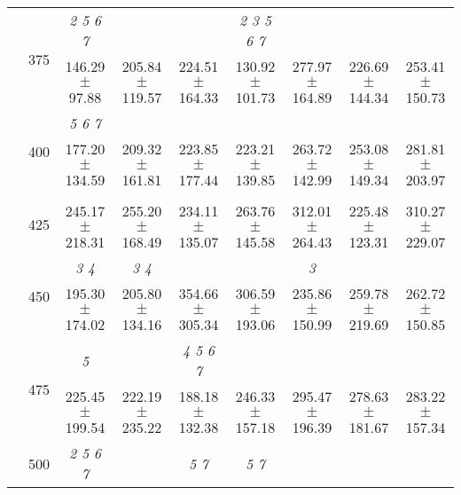 \begin{table}[h]
{\begin{tabular}{
        ccccccccc}
 & \multirow{2}{*}{375}& \cellcolor[HTML]{EFEFEF} \textit{ 2 5 6 7 }& \cellcolor[HTML]{EFEFEF} & \cellcolor[HTML]{EFEFEF} & \cellcolor[HTML]{EFEFEF} \textit{ 2 3 5 6 7 }& \cellcolor[HTML]{EFEFEF} & \cellcolor[HTML]{EFEFEF} & \cellcolor[HTML]{EFEFEF}  \\ 
 & & \cellcolor[HTML]{EFEFEF} 146.29 $\pm$ 97.88& \cellcolor[HTML]{EFEFEF} 205.84 $\pm$ 119.57& \cellcolor[HTML]{EFEFEF} 224.51 $\pm$ 164.33& \cellcolor[HTML]{EFEFEF} 130.92 $\pm$ 101.73& \cellcolor[HTML]{EFEFEF} 277.97 $\pm$ 164.89& \cellcolor[HTML]{EFEFEF} 226.69 $\pm$ 144.34& \cellcolor[HTML]{EFEFEF} 253.41 $\pm$ 150.73 \\ 
 & \multirow{2}{*}{400}& \textit{ 5 6 7 }& & & & & &  \\ 
 & & 177.20 $\pm$ 134.59& 209.32 $\pm$ 161.81& 223.85 $\pm$ 177.44& 223.21 $\pm$ 139.85& 263.72 $\pm$ 142.99& 253.08 $\pm$ 149.34& 281.81 $\pm$ 203.97 \\ 
 & \multirow{2}{*}{425}& \cellcolor[HTML]{EFEFEF} & \cellcolor[HTML]{EFEFEF} & \cellcolor[HTML]{EFEFEF} & \cellcolor[HTML]{EFEFEF} & \cellcolor[HTML]{EFEFEF} & \cellcolor[HTML]{EFEFEF} & \cellcolor[HTML]{EFEFEF}  \\ 
 & & \cellcolor[HTML]{EFEFEF} 245.17 $\pm$ 218.31& \cellcolor[HTML]{EFEFEF} 255.20 $\pm$ 168.49& \cellcolor[HTML]{EFEFEF} 234.11 $\pm$ 135.07& \cellcolor[HTML]{EFEFEF} 263.76 $\pm$ 145.58& \cellcolor[HTML]{EFEFEF} 312.01 $\pm$ 264.43& \cellcolor[HTML]{EFEFEF} 225.48 $\pm$ 123.31& \cellcolor[HTML]{EFEFEF} 310.27 $\pm$ 229.07 \\ 
 & \multirow{2}{*}{450}& \textit{ 3 4 }& \textit{ 3 4 }& & & \textit{ 3 }& &  \\ 
 & & 195.30 $\pm$ 174.02& 205.80 $\pm$ 134.16& 354.66 $\pm$ 305.34& 306.59 $\pm$ 193.06& 235.86 $\pm$ 150.99& 259.78 $\pm$ 219.69& 262.72 $\pm$ 150.85 \\ 
 & \multirow{2}{*}{475}& \cellcolor[HTML]{EFEFEF} \textit{ 5 }& \cellcolor[HTML]{EFEFEF} & \cellcolor[HTML]{EFEFEF} \textit{ 4 5 6 7 }& \cellcolor[HTML]{EFEFEF} & \cellcolor[HTML]{EFEFEF} & \cellcolor[HTML]{EFEFEF} & \cellcolor[HTML]{EFEFEF}  \\ 
 & & \cellcolor[HTML]{EFEFEF} 225.45 $\pm$ 199.54& \cellcolor[HTML]{EFEFEF} 222.19 $\pm$ 235.22& \cellcolor[HTML]{EFEFEF} 188.18 $\pm$ 132.38& \cellcolor[HTML]{EFEFEF} 246.33 $\pm$ 157.18& \cellcolor[HTML]{EFEFEF} 295.47 $\pm$ 196.39& \cellcolor[HTML]{EFEFEF} 278.63 $\pm$ 181.67& \cellcolor[HTML]{EFEFEF} 283.22 $\pm$ 157.34 \\ 
 & \multirow{2}{*}{500}& \textit{ 2 5 6 7 }& & \textit{ 5 7 }& \textit{ 5 7 }& & &  \\ 

\end{tabular}}
\end{table}
